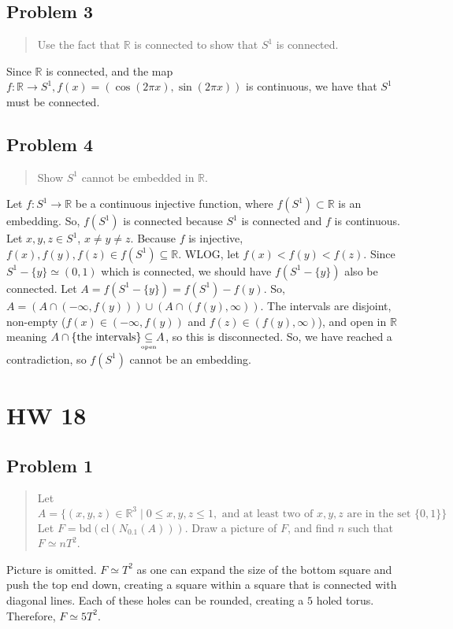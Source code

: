 \documentclass[8pt]{extarticle}
\newcommand{\open}{\underset{\clap{\tiny open}}{\subseteq}}
\begin{document}
{\subsection*{Problem 3}%

\begin{quote}
	Use the fact that $\mathbb{R}$ is connected to show that $S^1$ is connected.
\end{quote}
Since $\mathbb{R}$ is connected, and the map $f:\mathbb{R}\rightarrow S^1,f(x) = (\cos(2\pi x),\sin(2\pi x))$ is continuous, we have that $S^1$ must be connected.
\subsection*{Problem 4}%
\begin{quote}
	Show $S^1$ cannot be embedded in $\mathbb{R}$.
\end{quote}
Let $f:S^1\rightarrow \mathbb{R}$ be a continuous injective function, where $f(S^1)\subset \mathbb{R}$ is an embedding. So, $f(S^{1})$ is connected because $S^1$ is connected and $f$ is continuous. Let $x,y,z\in S^1$, $x\neq y\neq z$. Because $f$ is injective, $f(x),f(y),f(z)\in f(S^1)\subseteq \mathbb{R}$. WLOG, let $f(x)<f(y)<f(z)$. Since $S^{1}-\{y\}\simeq (0,1)$ which is connected, we should have $f(S^{1}-\{y\})$ also be connected. Let $A = f(S^1-\{y\}) = f(S^{1})-f(y)$. So, $A = (A\cap (-\infty,f(y)))\cup (A\cap (f(y),\infty))$. The intervals are disjoint, non-empty ($f(x)\in (-\infty,f(y))$ and $f(z)\in (f(y),\infty)$), and open in $\mathbb{R}$ meaning $A\cap\{\textrm{the intervals}\}\open A$, so this is disconnected. So, we have reached a contradiction, so $f(S^1)$ cannot be an embedding.
\pagebreak
\section*{HW 18}
\subsection*{Problem 1}
\begin{quote}
	Let $A = \{ (x,y,z)\in \mathbb{R}^3 \mid 0\leq x,y,z\leq 1, \textrm{ and at least two of $x,y,z$ are in the set }\{0,1\}\}$ Let $F = \textrm{bd}(\textrm{cl}(N_{0.1}(A)))$. Draw a picture of $F$, and find $n$ such that $F \simeq nT^2$.
\end{quote}
Picture is omitted. $F\simeq T^2$ as one can expand the size of the bottom square and push the top end down, creating a square within a square that is connected with diagonal lines. Each of these holes can be rounded, creating a $5$ holed torus. Therefore, $F\simeq 5T^2$.
}
\end{document}
